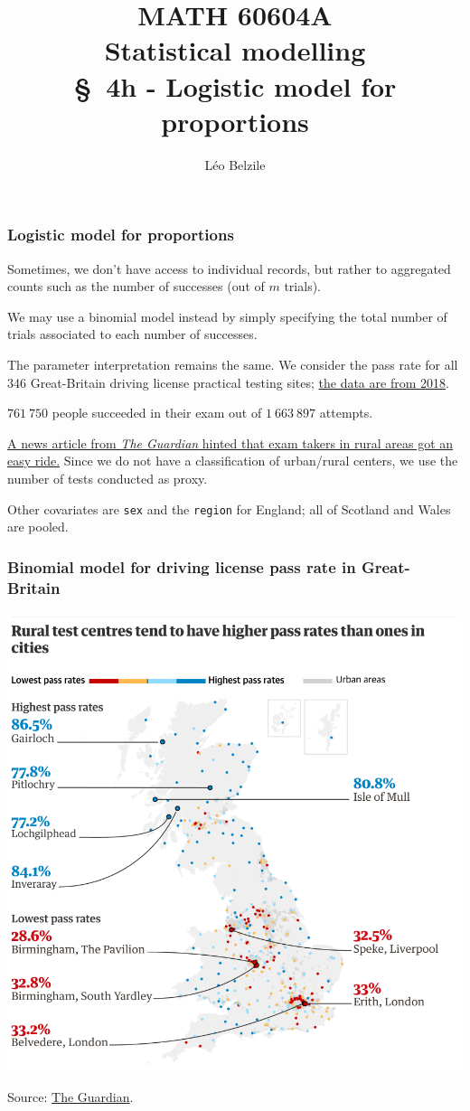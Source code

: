 \documentclass{beamer}
\title[\color{white}{MATH 60604A \S~4h - Logistic model for proportions}]{\texorpdfstring{MATH 60604A \\Statistical modelling \\ \S~4h - Logistic model for proportions}{MATH 60604A \\Statistical modelling \\ \S~4h - Logistic model for proportions}}
\author{Léo Belzile}
\institute{HEC Montréal\\
Department of Decision Sciences}
\date{}
\begin{document}
\frame{\titlepage}

\begin{frame}
 \frametitle{Logistic model for proportions}
 
 \bi \item Sometimes, we don't have access to individual records, but rather to aggregated counts such as the number of successes (out of $m$ trials).
 \item We may use a binomial model instead by simply specifying the total number of trials associated to each number of successes.
 \item The parameter interpretation remains the same.
 \ei 
 We consider the pass rate for all 346 Great-Britain driving license practical testing sites; \href{https://www.gov.uk/government/statistical-data-sets/driving-test-statistics-drt}{the data are from 2018}.

\bi 
\item $761\ 750$ people succeeded in their exam out of $1\ 663\ 897$ attempts.
\item \href{https://www.theguardian.com/world/2019/aug/23/an-easy-ride-scottish-village-fuels-debate-driving-test-pass-rates}{A news article from \textit{The Guardian} hinted that exam takers in rural areas got an easy ride.} Since we do not have a classification of urban/rural centers, we use the number of tests conducted as proxy.
\item Other covariates are \texttt{sex} and the \texttt{region} for England; all of Scotland and Wales are pooled.
\ei
 \end{frame}
 \begin{frame}
 \frametitle{Binomial model for driving license pass rate in Great-Britain}
 \begin{center}
  \includegraphics[width = 0.6\linewidth]{img/c4/01-intro-Guardian_UK_driving2.png}
 \end{center}
 {\footnotesize 
Source: \href{https://www.theguardian.com/world/2019/aug/23/an-easy-ride-scottish-village-fuels-debate-driving-test-pass-rates}{The Guardian}.}
\end{frame}
\end{document}
